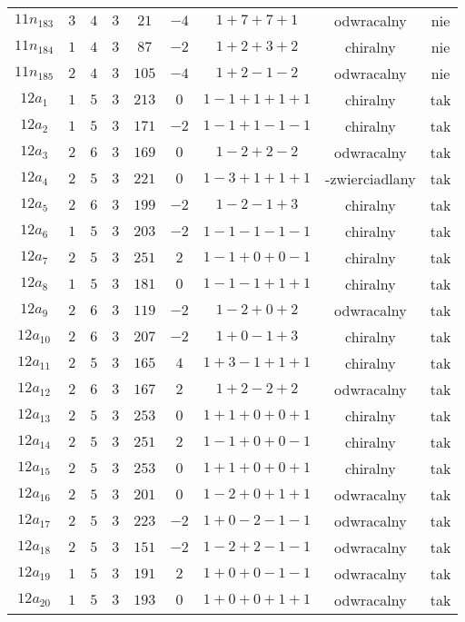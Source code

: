\begin{longtable}{ccccccccc}
$11n_{183}$ & $3$ & $4$ & $3$ & $21$ & $-4$ & $1+7+7+1$ & odwracalny & nie \\
$11n_{184}$ & $1$ & $4$ & $3$ & $87$ & $-2$ & $1+2+3+2$ & chiralny & nie \\
$11n_{185}$ & $2$ & $4$ & $3$ & $105$ & $-4$ & $1+2-1-2$ & odwracalny & nie \\
$12a_{1}$ & $1$ & $5$ & $3$ & $213$ & $0$ & $1-1+1+1+1$ & chiralny & tak \\
$12a_{2}$ & $1$ & $5$ & $3$ & $171$ & $-2$ & $1-1+1-1-1$ & chiralny & tak \\
$12a_{3}$ & $2$ & $6$ & $3$ & $169$ & $0$ & $1-2+2-2$ & odwracalny & tak \\
$12a_{4}$ & $2$ & $5$ & $3$ & $221$ & $0$ & $1-3+1+1+1$ & -zwierciadlany & tak \\
$12a_{5}$ & $2$ & $6$ & $3$ & $199$ & $-2$ & $1-2-1+3$ & chiralny & tak \\
$12a_{6}$ & $1$ & $5$ & $3$ & $203$ & $-2$ & $1-1-1-1-1$ & chiralny & tak \\
$12a_{7}$ & $2$ & $5$ & $3$ & $251$ & $2$ & $1-1+0+0-1$ & chiralny & tak \\
$12a_{8}$ & $1$ & $5$ & $3$ & $181$ & $0$ & $1-1-1+1+1$ & chiralny & tak \\
$12a_{9}$ & $2$ & $6$ & $3$ & $119$ & $-2$ & $1-2+0+2$ & odwracalny & tak \\
$12a_{10}$ & $2$ & $6$ & $3$ & $207$ & $-2$ & $1+0-1+3$ & chiralny & tak \\
$12a_{11}$ & $2$ & $5$ & $3$ & $165$ & $4$ & $1+3-1+1+1$ & chiralny & tak \\
$12a_{12}$ & $2$ & $6$ & $3$ & $167$ & $2$ & $1+2-2+2$ & odwracalny & tak \\
$12a_{13}$ & $2$ & $5$ & $3$ & $253$ & $0$ & $1+1+0+0+1$ & chiralny & tak \\
$12a_{14}$ & $2$ & $5$ & $3$ & $251$ & $2$ & $1-1+0+0-1$ & chiralny & tak \\
$12a_{15}$ & $2$ & $5$ & $3$ & $253$ & $0$ & $1+1+0+0+1$ & chiralny & tak \\
$12a_{16}$ & $2$ & $5$ & $3$ & $201$ & $0$ & $1-2+0+1+1$ & odwracalny & tak \\
$12a_{17}$ & $2$ & $5$ & $3$ & $223$ & $-2$ & $1+0-2-1-1$ & odwracalny & tak \\
$12a_{18}$ & $2$ & $5$ & $3$ & $151$ & $-2$ & $1-2+2-1-1$ & odwracalny & tak \\
$12a_{19}$ & $1$ & $5$ & $3$ & $191$ & $2$ & $1+0+0-1-1$ & odwracalny & tak \\
$12a_{20}$ & $1$ & $5$ & $3$ & $193$ & $0$ & $1+0+0+1+1$ & odwracalny & tak \\

\end{longtable}

